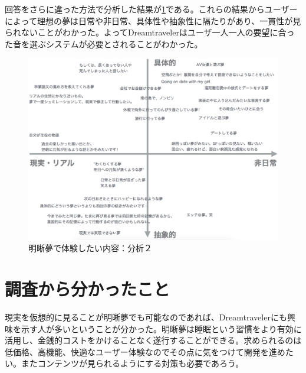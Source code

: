 回答をさらに違った方法で分析した結果が\ref{desiredDreamTpye2}である。これらの結果からユーザーによって理想の夢は日常や非日常、具体性や抽象性に隔たりがあり、一貫性が見られないことがわかった。よってDreamtravelerはユーザ一人一人の要望に合った音を選ぶシステムが必要とされることがわかった。

\begin{figure}[htbp]
\begin{center}
\includegraphics[width=15cm]{eps/whatYouWantToDream.eps}
\caption{明晰夢で体験したい内容：分析２}
\label{desiredDreamTpye2}
\end{center}
\end{figure}

\section{調査から分かったこと}
現実を仮想的に見ることが明晰夢でも可能なのであれば、Dreamtravelerにも興味を示す人が多いということが分かった。明晰夢は睡眠という習慣をより有効に活用し、金銭的コストをかけることなく遂行することができる。求められるのは低価格、高機能、快適なユーザー体験なのでその点に気をつけて開発を進めたい。またコンテンツが見られるようにする対策も必要であろう。